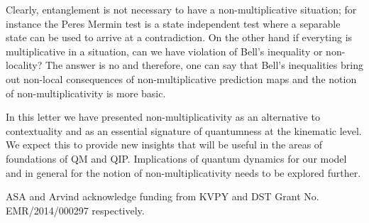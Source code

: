 \documentclass[british,aps,prl,superscriptaddress,nofootinbib,times,reprint]{revtex4-1}
\theoremstyle{plain}
\theoremstyle{plain}
\theoremstyle{definition}
\theoremstyle{remark}
\theoremstyle{remark}
\theoremstyle{remark}
\theoremstyle{plain}
\theoremstyle{plain}
\theoremstyle{plain}
\theoremstyle{definition}
\theoremstyle{definition}
\begin{document}
Clearly, entanglement is not necessary to have a
non-multiplicative situation; for instance the
Peres Mermin test is a state independent test
where a separable state can be used to arrive at a
contradiction. On the other hand if everyting is
multiplicative in a situation, can we have
violation of Bell's inequality or non-locality?
The answer is no and therefore, one can say that
Bell's inequalities bring out  non-local
consequences of  non-multiplicative prediction
maps and the notion of non-multiplicativity is
more basic.  


In this letter we have presented
non-multiplicativity as an alternative to
contextuality and as an essential signature of
quantumness at the kinematic level.  We expect
this to provide new insights that will be useful
in the areas of foundations of QM and QIP.
{\color{red} Implications of quantum dynamics for
our model and in general for the notion of
non-multiplicativity needs to be explored
further.}
\begin{acknowledgments} ASA and Arvind acknowledge
funding from KVPY and DST Grant No.
EMR/2014/000297 respectively.
\end{acknowledgments}
%
 
\end{document}
